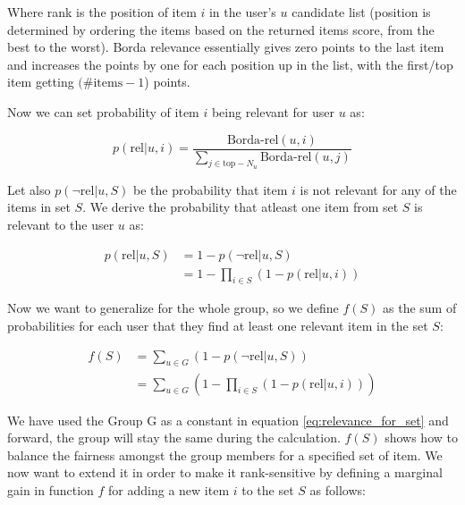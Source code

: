 Where rank is the position of item $i$ in the user's $u$ candidate list (position is determined by ordering the items based on the returned items score, from the best to the worst). Borda relevance essentially gives zero points to the last item and increases the points by one for each position up in the list, with the first/top item getting $(\#\textrm{items} - 1$) points.

Now we can set probability of item $i$ being relevant for user $u$ as:

\begin{equation}
    p(\textrm{rel}|u, i) = \frac{\textrm{Borda-rel}(u, i)}{\sum_{j \in \textrm{top}-N_u}{\textrm{Borda-rel}(u, j)}}
\end{equation}

Let also $p(\neg\textrm{rel}|u, S)$ be the probability that item $i$ is not relevant for any of the items in set $S$. We derive the probability that atleast one item from set $S$ is relevant to the user $u$ as:

\begin{equation} \label{eq:atleast_one_relevant}
\begin{aligned}
    p(\textrm{rel}|u, S) &= 1 - p(\neg\textrm{rel}|u, S) \\
    & = 1 - \prod_{i \in S}{(1 - p(\textrm{rel}|u, i))}
\end{aligned}
\end{equation}

Now we want to generalize for the whole group, so we define $f(S)$ as the sum of probabilities for each user that they find at least one relevant item in the set $S$:

\begin{equation} \label{eq:relevance_for_set}
\begin{aligned}
    f(S) &= \sum_{u \in G}{\left(1 - p(\neg\textrm{rel}|u, S)\right)} \\
    & = \sum_{u \in G}{\left(1 - \prod_{i \in S}{(1 - p(\textrm{rel}|u, i))}\right)}
\end{aligned}
\end{equation}

We have used the Group G as a constant in equation \ref{eq:relevance_for_set} and forward, the group will stay the same during the calculation. $f(S)$ shows how to balance the fairness amongst the group members for a specified set of item. We now want to extend it in order to make it rank-sensitive by defining a marginal gain in function $f$ for adding a new item $i$ to the set $S$ as follows:

